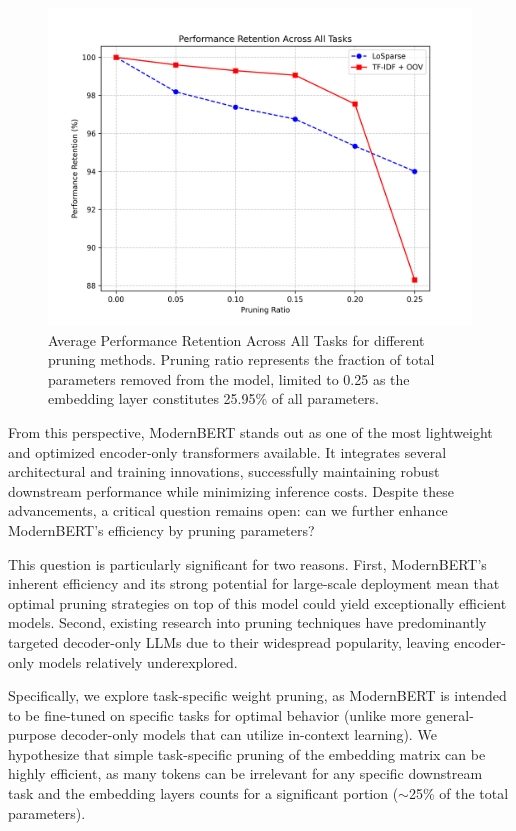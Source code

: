 \documentclass[twocolumn]{article}
\begin{document}
\begin{figure}[t]
\centering
\includegraphics[width=\columnwidth]{images/performance_retention.png}
\caption{Average Performance Retention Across All Tasks for different pruning methods. Pruning ratio represents the fraction of total parameters removed from the model, limited to 0.25 as the embedding layer constitutes 25.95\% of all parameters.}
\label{fig:pruning_retention}
\end{figure}

From this perspective, ModernBERT stands out as one of the most lightweight and optimized encoder-only transformers available. It integrates several architectural and training innovations, successfully maintaining robust downstream performance while minimizing inference costs. Despite these advancements, a critical question remains open: can we further enhance ModernBERT's efficiency by pruning parameters?

This question is particularly significant for two reasons. First, ModernBERT's inherent efficiency and its strong potential for large-scale deployment mean that optimal pruning strategies on top of this model could yield exceptionally efficient models. Second, existing research into pruning techniques have predominantly targeted decoder-only LLMs \cite{namburi2023llm} due to their widespread popularity, leaving encoder-only models relatively underexplored.

Specifically, we explore task-specific weight pruning, as ModernBERT is intended to be fine-tuned on specific tasks for optimal behavior (unlike more general-purpose decoder-only models that can utilize in-context learning). We hypothesize that simple task-specific pruning of the embedding matrix can be highly efficient, as many tokens can be irrelevant for any specific downstream task and the embedding layers counts for a significant portion ($\sim$25\% of the total parameters).
\end{document}
